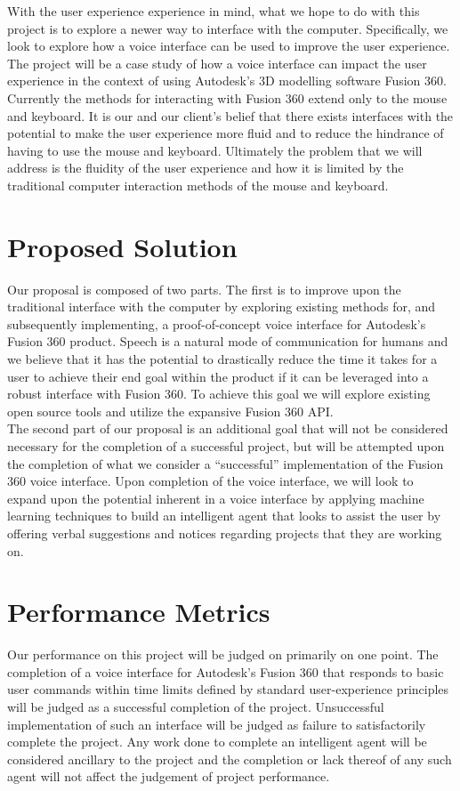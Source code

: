 \documentclass[10pt, draftclsnofoot, onecolumn]{IEEEtran}
\begin{document}
With the user experience experience in mind, what we hope to do with this project is to explore a newer way to interface with the computer. Specifically, we look to explore how a voice interface can be used to improve the user experience. \\

The project will be a case study of how a voice interface can impact the user experience in the context of using Autodesk’s 3D modelling software Fusion 360. Currently the methods for interacting with Fusion 360 extend only to the mouse and keyboard. It is our and our client’s belief that there exists interfaces with the potential to make the user experience more fluid and to reduce the hindrance of having to use the mouse and keyboard. Ultimately the problem that we will address is the fluidity of the user experience and how it is limited by the traditional computer interaction methods of the mouse and keyboard. \\

\section*{Proposed Solution}
Our proposal is composed of two parts. The first is to improve upon the traditional interface with the computer by exploring existing methods for, and subsequently implementing, a proof-of-concept voice interface for Autodesk’s Fusion 360 product. Speech is a natural mode of communication for humans and we believe that it has the potential to drastically reduce the time it takes for a user to achieve their end goal within the product if it can be leveraged into a robust interface with Fusion 360. To achieve this goal we will explore existing open source tools and utilize the expansive Fusion 360 API. \\ 

The second part of our proposal is an additional goal that will not be considered necessary for the completion of a successful project, but will be attempted upon the completion of what we consider a “successful” implementation of the Fusion 360 voice interface. Upon completion of the voice interface, we will look to expand upon the potential inherent in a voice interface by applying machine learning techniques to build an intelligent agent that looks to assist the user by offering verbal suggestions and notices regarding projects that they are working on. \\

\section*{Performance Metrics}
Our performance on this project will be judged on primarily on one point. The completion of a voice interface for Autodesk’s Fusion 360 that responds to basic user commands within time limits defined by standard user-experience principles will be judged as a successful completion of the project. Unsuccessful implementation of such an interface will be judged as failure to satisfactorily complete the project. Any work done to complete an intelligent agent will be considered ancillary to the project and the completion or lack thereof of any such agent will not affect the judgement of project performance. \\
\end{document}
